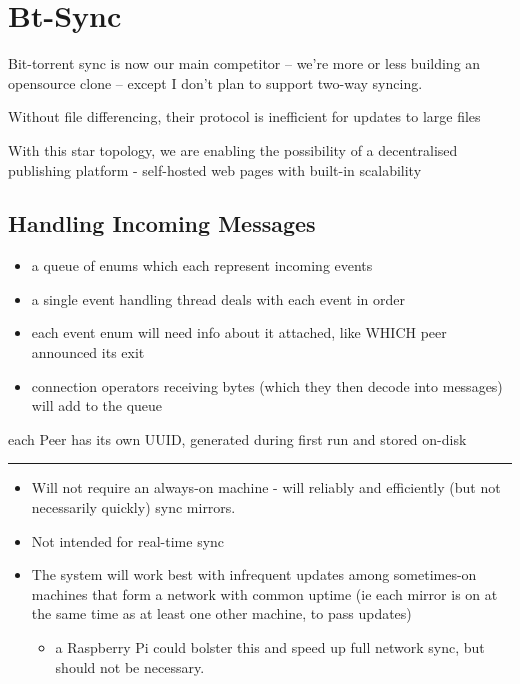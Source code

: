 \documentclass[12pt,a4paper,]{adreport}
\begin{document}
\chapter{Bt-Sync}\label{bt-sync}

Bit-torrent sync is now our main competitor -- we're more or less
building an opensource clone -- except I don't plan to support two-way
syncing.

Without file differencing, their protocol is inefficient for updates to
large files

With this star topology, we are enabling the possibility of a
decentralised publishing platform - self-hosted web pages with built-in
scalability

\section{Handling Incoming Messages}\label{handling-incoming-messages}

\begin{itemize}
\itemsep1pt\parskip0pt
\item
  a queue of enums which each represent incoming events
\item
  a single event handling thread deals with each event in order
\item
  each event enum will need info about it attached, like WHICH peer
  announced its exit
\item
  connection operators receiving bytes (which they then decode into
  messages) will add to the queue
\end{itemize}

each Peer has its own UUID, generated during first run and stored
on-disk

\begin{center}\rule{3in}{0.4pt}\end{center}

\begin{itemize}
\itemsep1pt\parskip0pt
\item
  Will not require an always-on machine - will reliably and efficiently
  (but not necessarily quickly) sync mirrors.
\item
  Not intended for real-time sync
\item
  The system will work best with infrequent updates among sometimes-on
  machines that form a network with common uptime (ie each mirror is on
  at the same time as at least one other machine, to pass updates)

  \begin{itemize}
  \itemsep1pt\parskip0pt
  \item
    a Raspberry Pi could bolster this and speed up full network sync,
    but should not be necessary.
  \end{itemize}
\end{itemize}
\end{document}
